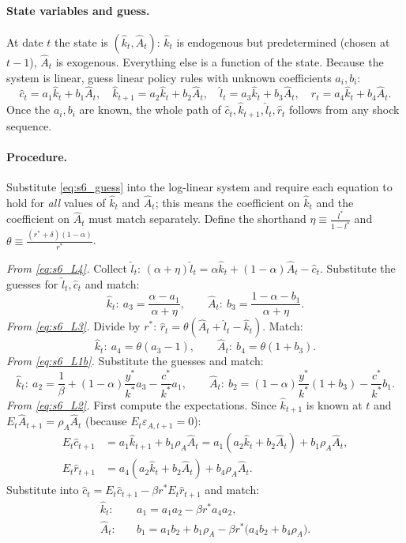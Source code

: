 \paragraph{State variables and guess.} At date $t$ the state is $(\hat k_t,\hat A_t)$: $\hat k_t$ is endogenous but predetermined (chosen at $t-1$), $\hat A_t$ is exogenous. Everything else is a function of the state. Because the system is linear, guess linear policy rules with unknown coefficients $a_i,b_i$:
\begin{equation}\label{eq:s6_guess}
\hat c_t=a_1\hat k_t+b_1\hat A_t,\quad
\hat k_{t+1}=a_2\hat k_t+b_2\hat A_t,\quad
\hat l_t=a_3\hat k_t+b_3\hat A_t,\quad
\hat r_t=a_4\hat k_t+b_4\hat A_t .
\end{equation}
Once the $a_i,b_i$ are known, the whole path of $\hat c_t,\hat k_{t+1},\hat l_t,\hat r_t$ follows from any shock sequence.

\paragraph{Procedure.} Substitute \eqref{eq:s6_guess} into the log-linear system and require each equation to hold for \emph{all} values of $\hat k_t$ and $\hat A_t$; this means the coefficient on $\hat k_t$ and the coefficient on $\hat A_t$ must match separately. Define the shorthand $\eta\equiv\frac{l^*}{1-l^*}$ and $\theta\equiv\frac{(r^*+\delta)(1-\alpha)}{r^*}$.

\emph{From \eqref{eq:s6_L4}.} Collect $\hat l_t$: $(\alpha+\eta)\hat l_t=\alpha\hat k_t+(1-\alpha)\hat A_t-\hat c_t$. Substitute the guesses for $\hat l_t,\hat c_t$ and match:
\[
\hat k_t:\ a_3=\frac{\alpha-a_1}{\alpha+\eta},\qquad \hat A_t:\ b_3=\frac{1-\alpha-b_1}{\alpha+\eta}.
\]
\emph{From \eqref{eq:s6_L3}.} Divide by $r^*$: $\hat r_t=\theta(\hat A_t+\hat l_t-\hat k_t)$. Match:
\[
\hat k_t:\ a_4=\theta(a_3-1),\qquad \hat A_t:\ b_4=\theta(1+b_3).
\]
\emph{From \eqref{eq:s6_L1b}.} Substitute the guesses and match:
\[
\hat k_t:\ a_2=\frac1\beta+(1-\alpha)\frac{y^*}{k^*}a_3-\frac{c^*}{k^*}a_1,\qquad
\hat A_t:\ b_2=(1-\alpha)\frac{y^*}{k^*}(1+b_3)-\frac{c^*}{k^*}b_1 .
\]
\emph{From \eqref{eq:s6_L2}.} First compute the expectations. Since $\hat k_{t+1}$ is known at $t$ and $E_t\hat A_{t+1}=\rho_A\hat A_t$ (because $E_t\varepsilon_{A,t+1}=0$):
\begin{align*}
E_t\hat c_{t+1}&=a_1\hat k_{t+1}+b_1\rho_A\hat A_t=a_1(a_2\hat k_t+b_2\hat A_t)+b_1\rho_A\hat A_t,\\
E_t\hat r_{t+1}&=a_4(a_2\hat k_t+b_2\hat A_t)+b_4\rho_A\hat A_t .
\end{align*}
Substitute into $\hat c_t=E_t\hat c_{t+1}-\beta r^*E_t\hat r_{t+1}$ and match:
\begin{align*}
\hat k_t:&\quad a_1=a_1a_2-\beta r^*a_4a_2,\\
\hat A_t:&\quad b_1=a_1b_2+b_1\rho_A-\beta r^*\big(a_4b_2+b_4\rho_A\big).
\end{align*}


